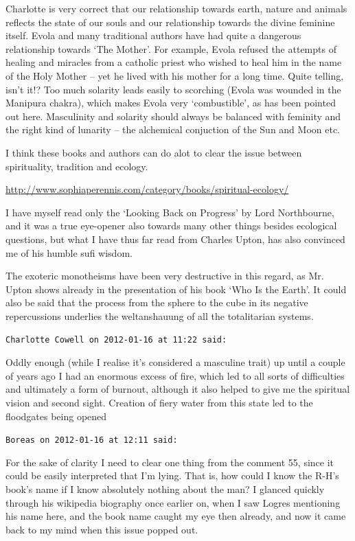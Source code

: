 \begin{footnotesize}
\begin{sffamily}
Charlotte is very correct that our relationship towards earth, nature and animals reflects the state of our souls and our relationship towards the divine feminine itself. Evola and many traditional authors have had quite a dangerous relationship towards `The Mother'. For example, Evola refused the attempts of healing and miracles from a catholic priest who wished to heal him in the name of the Holy Mother -- yet he lived with his mother for a long time. Quite telling, isn't it!? Too much solarity leads easily to scorching (Evola was wounded in the Manipura chakra), which makes Evola very `combustible', as has been pointed out here. Masculinity and solarity should always be balanced with feminity and the right kind of lunarity -- the alchemical conjuction of the Sun and Moon etc.

I think these books and authors can do alot to clear the issue between spirituality, tradition and ecology.

\url{http://www.sophiaperennis.com/category/books/spiritual-ecology/}


I have myself read only the `Looking Back on Progress' by Lord Northbourne, and it was a true eye-opener also towards many other things besides ecological questions, but what I have thus far read from Charles Upton, has also convinced me of his humble sufi wisdom.

The exoteric monotheisms have been very destructive in this regard, as Mr. Upton shows already in the presentation of his book `Who Is the Earth'. It could also be said that the process from the sphere to the cube in its negative repercussions underlies the weltanshauung of all the totalitarian systems.

\hfill

\texttt{Charlotte Cowell on 2012-01-16 at 11:22 said:}

Oddly enough (while I realise it's considered a masculine trait) up until a couple of years ago I had an enormous excess of fire, which led to all sorts of difficulties and ultimately a form of burnout, although it also helped to give me the spiritual vision and second sight. Creation of fiery water from this state led to the floodgates being opened

\hfill

\texttt{Boreas on 2012-01-16 at 12:11 said:}

For the sake of clarity I need to clear one thing from the comment 55, since it could be easily interpreted that I'm lying. That is, how could I know the R-H's book's name if I know absolutely nothing about the man? I glanced quickly through his wikipedia biography once earlier on, when I saw Logres mentioning his name here, and the book name caught my eye then already, and now it came back to my mind when this issue popped out.


\end{sffamily}
\end{footnotesize}
